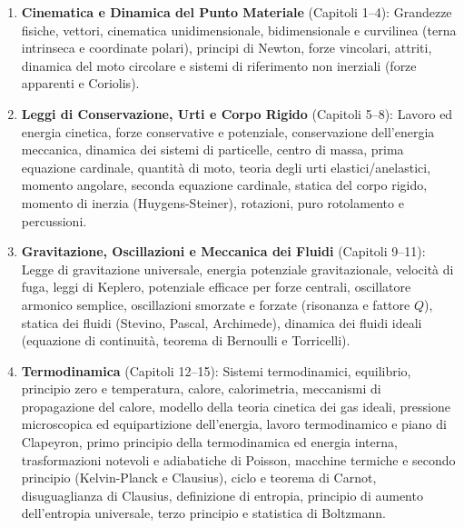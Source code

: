\documentclass[11pt,a4paper,twoside,openright]{book}
\begin{document}
\begin{enumerate}[label=\textbf{\Roman*.}]
    \item \textbf{Cinematica e Dinamica del Punto Materiale} (Capitoli 1--4):
    Grandezze fisiche, vettori, cinematica unidimensionale, bidimensionale e curvilinea (terna intrinseca e coordinate polari), principi di Newton, forze vincolari, attriti, dinamica del moto circolare e sistemi di riferimento non inerziali (forze apparenti e Coriolis).
    
    \item \textbf{Leggi di Conservazione, Urti e Corpo Rigido} (Capitoli 5--8):
    Lavoro ed energia cinetica, forze conservative e potenziale, conservazione dell'energia meccanica, dinamica dei sistemi di particelle, centro di massa, prima equazione cardinale, quantità di moto, teoria degli urti elastici/anelastici, momento angolare, seconda equazione cardinale, statica del corpo rigido, momento di inerzia (Huygens-Steiner), rotazioni, puro rotolamento e percussioni.
    
    \item \textbf{Gravitazione, Oscillazioni e Meccanica dei Fluidi} (Capitoli 9--11):
    Legge di gravitazione universale, energia potenziale gravitazionale, velocità di fuga, leggi di Keplero, potenziale efficace per forze centrali, oscillatore armonico semplice, oscillazioni smorzate e forzate (risonanza e fattore $Q$), statica dei fluidi (Stevino, Pascal, Archimede), dinamica dei fluidi ideali (equazione di continuità, teorema di Bernoulli e Torricelli).
    
    \item \textbf{Termodinamica} (Capitoli 12--15):
    Sistemi termodinamici, equilibrio, principio zero e temperatura, calore, calorimetria, meccanismi di propagazione del calore, modello della teoria cinetica dei gas ideali, pressione microscopica ed equipartizione dell'energia, lavoro termodinamico e piano di Clapeyron, primo principio della termodinamica ed energia interna, trasformazioni notevoli e adiabatiche di Poisson, macchine termiche e secondo principio (Kelvin-Planck e Clausius), ciclo e teorema di Carnot, disuguaglianza di Clausius, definizione di entropia, principio di aumento dell'entropia universale, terzo principio e statistica di Boltzmann.
\end{enumerate}

\cleardoublepage

\mainmatter
\end{document}
